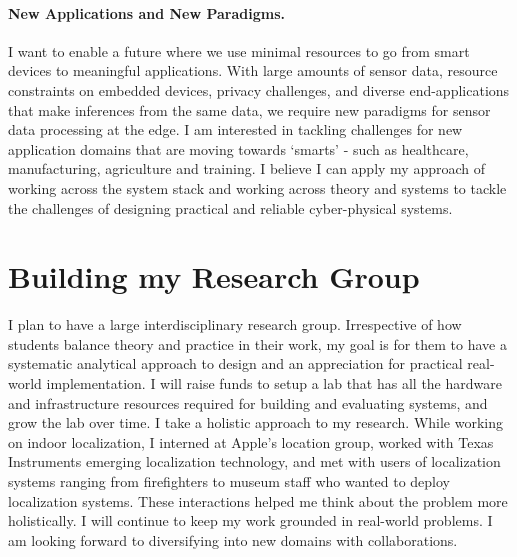 \documentclass[10pt]{article}
\begin{document}
\paragraph{New Applications and New Paradigms. }
I want to enable a future where we use minimal resources to go from smart devices to meaningful applications. 
With large amounts of sensor data, resource constraints on embedded devices, privacy challenges, and diverse end-applications that make	 inferences from the same data, we require new paradigms for 
sensor data processing at the edge. %
I am interested in tackling challenges for new application domains that are moving towards `smarts' - such as healthcare, manufacturing, agriculture and training. 
I believe I can apply my approach of working across the system stack and working across theory and systems %
to tackle the challenges of designing practical and reliable cyber-physical systems. 

\section{Building my Research Group}
I plan to have a large interdisciplinary research group. Irrespective of how students balance theory and practice in their work, my goal is for them to have a systematic analytical approach to design and an appreciation for practical real-world implementation. I will raise funds to setup a lab that has all the hardware and infrastructure resources required for building and evaluating systems, and grow the lab over time. I take a holistic approach to my research. While working on indoor localization, I interned at Apple's location group, worked with Texas Instruments emerging localization technology, and met with users of localization systems ranging from firefighters to museum staff who wanted to deploy localization systems. These interactions helped me think about the problem more holistically.  I will continue to keep my work grounded in real-world problems. I am looking forward to diversifying into new domains with collaborations.  \\
\end{document}

